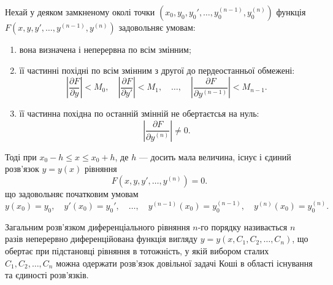\begin{theorem}
	Нехай у деяком замкненому околі точки $\left(x_0, y_0, y_0', \ldots, y_0^{(n-1)}, y_0^{(n)}\right)$ функція $F\left(x,y,y',\ldots,y^{(n-1)},y^{(n)}\right)$ задовольняє умовам:
	\begin{enumerate}
		\item вона визначена і неперервна по всім змінним;
		\item її частинні похідні по всім змінним з другої до пердеостанньої обмежені:
		\begin{equation*}
			\left|\frac{\partial F}{\partial y}\right| < M_0, \quad \left|\frac{\partial F}{\partial y'}\right| < M_1, \quad \ldots, \quad \left|\frac{\partial F}{\partial y^{(n-1)}}\right| < M_{n-1}.
		\end{equation*}
		\item її частинна похідна по останній змінній не обертаєтсья на нуль: \[\left|\frac{\partial F}{\partial y^{(n)}}\right|\ne0.\]
	\end{enumerate}
	
	Тоді при $x_0 - h \le x \le x_0 + h$, де $h$ --- досить мала величина, існує і єдиний розв'язок $y=y(x)$ рівняння
	\begin{equation*}
		F \left( x, y, y', \ldots, y^{(n)} \right) = 0.
	\end{equation*}
	що задовольняє початковим умовам
	\begin{equation*}
		y(x_0) = y_0, \quad y'(x_0) = y_0', \quad \ldots, \quad y^{(n - 1)} (x_0) = y_0^{(n-1)}, \quad y^{(n)} (x_0) = y_0^{(n)}.
	\end{equation*}
\end{theorem}

\begin{definition}
	Загальним розв'язком диференціального рівняння $n$-го порядку називається $n$ разів неперервно диференційована функція вигляду $y = y(x,C_1, C_2, \ldots, C_n)$, що обертає при підстановці рівняння в тотожність, у якій вибором сталих $C_1, C_2, \ldots, C_n$ можна одержати розв'язок довільної задачі Коші в області існування та єдиності розв'язків.
\end{definition}

